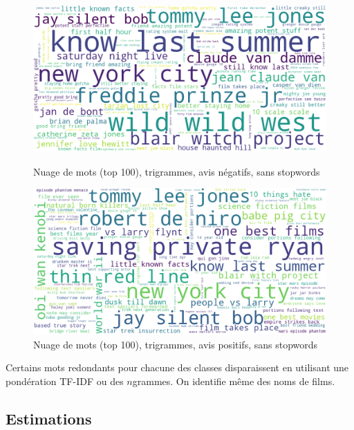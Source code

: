 \documentclass{article}
\begin{document}
\begin{figure}[H]
    \centering
    \begin{minipage}{0.48\textwidth}
        \includegraphics[width=\textwidth]{./src/movies/wordclouds_neg_nostopwords_3grams.png} 
        \caption{Nuage de mots (top 100), trigrammes, avis négatifs, sans stopwords}
        \label{wordclouds_neg_nostopwords_2grams}
    \end{minipage}
    \hfill
    \begin{minipage}{0.48\textwidth}
        \includegraphics[width=\textwidth]{./src/movies/wordclouds_pos_nostopwords_3grams.png} 
        \caption{Nuage de mots (top 100), trigrammes, avis positifs, sans stopwords}
        \label{wordclouds_pos_nostopwords_2grams}
    \end{minipage}
\end{figure}

Certains mots redondants pour chacune des classes disparaissent en utilisant une pondération TF-IDF ou des $n$grammes. On identifie même des noms de films.

\subsection{Estimations}
\end{document}
